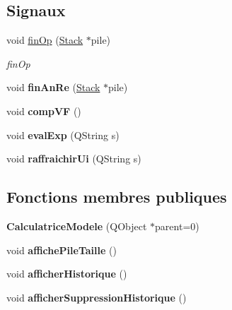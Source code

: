 \subsection*{Signaux}
\begin{DoxyCompactItemize}
\item 
void \hyperlink{class_calculatrice_modele_a17e47a75631ae25f15dfe0303ec85582}{fin\-Op} (\hyperlink{class_stack}{Stack} $\ast$pile)
\begin{DoxyCompactList}\small\item\em fin\-Op \end{DoxyCompactList}\item 
\hypertarget{class_calculatrice_modele_aa55d1cd9b194be54fa7b7730fada0cf4}{void {\bfseries fin\-An\-Re} (\hyperlink{class_stack}{Stack} $\ast$pile)}\label{class_calculatrice_modele_aa55d1cd9b194be54fa7b7730fada0cf4}

\item 
\hypertarget{class_calculatrice_modele_a8e13b38cbeccca64f4e440084a1a850e}{void {\bfseries comp\-V\-F} ()}\label{class_calculatrice_modele_a8e13b38cbeccca64f4e440084a1a850e}

\item 
\hypertarget{class_calculatrice_modele_ad741ddfdf7320455e53b0499bd9ec6b6}{void {\bfseries eval\-Exp} (Q\-String s)}\label{class_calculatrice_modele_ad741ddfdf7320455e53b0499bd9ec6b6}

\item 
\hypertarget{class_calculatrice_modele_a397e47d552424f90f8fe743f0fee70dd}{void {\bfseries raffraichir\-Ui} (Q\-String s)}\label{class_calculatrice_modele_a397e47d552424f90f8fe743f0fee70dd}

\end{DoxyCompactItemize}
\subsection*{Fonctions membres publiques}
\begin{DoxyCompactItemize}
\item 
\hypertarget{class_calculatrice_modele_acdb374ef7094036d07dfd59241674a7c}{{\bfseries Calculatrice\-Modele} (Q\-Object $\ast$parent=0)}\label{class_calculatrice_modele_acdb374ef7094036d07dfd59241674a7c}

\item 
\hypertarget{class_calculatrice_modele_ae311466b783cc6418efeaef854df461a}{void {\bfseries affiche\-Pile\-Taille} ()}\label{class_calculatrice_modele_ae311466b783cc6418efeaef854df461a}

\item 
\hypertarget{class_calculatrice_modele_aa66a666b1c62f96a3f4a2c7f0a34a7c9}{void {\bfseries afficher\-Historique} ()}\label{class_calculatrice_modele_aa66a666b1c62f96a3f4a2c7f0a34a7c9}

\item 
\hypertarget{class_calculatrice_modele_a7eb04a93cb5da9eba47fe47e97c46321}{void {\bfseries afficher\-Suppression\-Historique} ()}\label{class_calculatrice_modele_a7eb04a93cb5da9eba47fe47e97c46321}

\end{DoxyCompactItemize}


